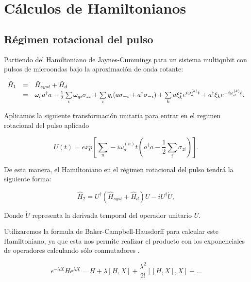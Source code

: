 \chapter{Cálculos de Hamiltonianos}
\label{ch:hamiltonians}

\section{Régimen rotacional del pulso}

Partiendo del Hamiltoniano de Jaynes-Cummings para un sistema multiqubit con pulsos de microondas bajo la aproximación de onda rotante:

\begin{equation}
    \begin{array}{r c l}
        \hat{H}_1 &=& \hat{H}_{syst} + \hat{H}_d \\
                  &=& \omega_r a^\dag a - \frac{1}{2} \sum\limits_i \omega_{qi} \sigma_{zi} + \sum\limits_i g_i (a \sigma_{+ i} + a^\dagger \sigma_{- i}) + \sum\limits_k a\xi_k^*e^{i\omega_d^{(k)}t}+ a^\dagger\xi_ke^{-i\omega_d^{(k)}t} .
    \end{array}
\end{equation}

Aplicamos la siguiente transformación unitaria para entrar en el regimen rotacional del pulso aplicado

\begin{equation}
    U(t) = exp[\sum\limits_n-i \omega_d^{(n)} t(a^\dagger a - \frac{1}{2} \sum\limits_i \sigma_{z i})] .
\end{equation}

De esta manera, el Hamiltoniano en el régimen rotacional del pulso tendrá la siguiente forma:

\begin{equation}
    \hat{H}_2 = U^\dagger (\hat{H}_{syst} + \hat{H}_d) U - i U^\dagger \dot{U} ,
\end{equation}

Donde $\dot{U}$ representa la derivada temporal del operador unitario $U$.

Utilizaremos la formula de Baker-Campbell-Hausdorff para calcular este Hamiltoniano, ya que esta nos permite realizar el producto con los exponenciales de operadores calculando sólo conmutadores \cite{Suzuki_1985}.

\begin{equation}
    e^{-\lambda X} H e^{\lambda X} = H + \lambda [H,X] + \frac{\lambda^2}{2!}[[H,X],X] + ...
\end{equation}

